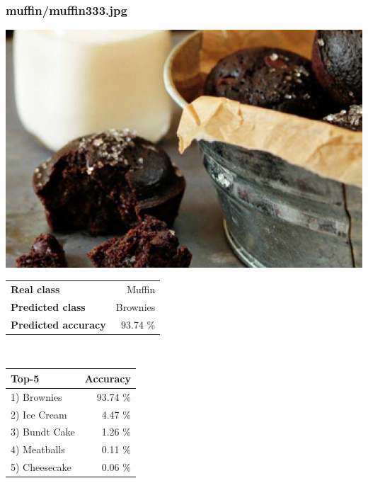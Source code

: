 \subsubsection{muffin/muffin333.jpg}

\begin{minipage}[t]{0.4\textwidth}
	\vspace{0pt}
	\includegraphics[width=\linewidth]{images/evaluation-images/muffin/muffin333.jpg}
\end{minipage}
\hfill
\begin{minipage}[t]{0.5\textwidth}
	\vspace{0pt}\raggedright
	\begin{tabularx}{\textwidth}{X r}
		\small \textbf{Real class} & \small Muffin\\
		\small \textbf{Predicted class} & \small Brownies\\
		\small \textbf{Predicted accuracy} & \small 93.74 \%
    \end{tabularx}\\
    
    \vspace{6pt}
	\begin{tabularx}{\textwidth}{X r}
        \small \textbf{Top-5} & \small \textbf{Accuracy} \\
        \hline
		\small 1) Brownies & \small 93.74 \%\\\small 2) Ice Cream & \small 4.47 \%\\\small 3) Bundt Cake & \small 1.26 \%\\\small 4) Meatballs & \small 0.11 \%\\\small 5) Cheesecake & \small 0.06 \%
    \end{tabularx}
\end{minipage}
    
